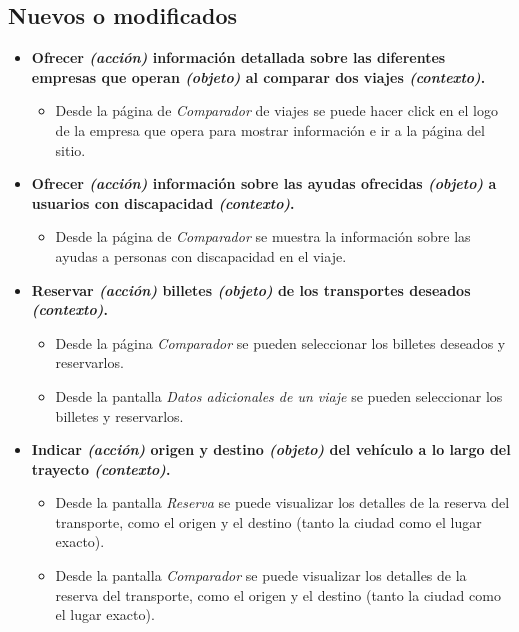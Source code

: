 \subsection*{Nuevos o modificados}

\begin{itemize}
    \item \textbf{Ofrecer \textit{(acción)} información detallada sobre las diferentes empresas que operan
        \textit{(objeto)} al comparar dos viajes \textit{(contexto)}.}
        \begin{itemize}
            \item Desde la página de \textit{Comparador} de viajes se puede hacer click en el logo de la empresa que
                opera para mostrar información e ir a la página del sitio.
        \end{itemize}
    
    \item \textbf{Ofrecer \textit{(acción)} información sobre las ayudas ofrecidas \textit{(objeto)} a usuarios 
        con discapacidad \textit{(contexto)}.}
        \begin{itemize}
            \item Desde la página de \textit{Comparador} se muestra la información sobre las ayudas a personas
                con discapacidad en el viaje.
        \end{itemize}
    
    \item \textbf{Reservar \textit{(acción)} billetes \textit{(objeto)} de los transportes deseados \textit{(contexto)}.} 
        \begin{itemize}
            \item Desde la página \textit{Comparador} se pueden seleccionar los billetes deseados y reservarlos.
            \item Desde la pantalla \textit{Datos adicionales de un viaje} se pueden seleccionar los billetes y reservarlos.
        \end{itemize}

    \item \textbf{Indicar \textit{(acción)} origen y destino \textit{(objeto)} del vehículo a lo largo del trayecto
        \textit{(contexto)}.}
        \begin{itemize}
            \item Desde la pantalla \textit{Reserva} se puede visualizar los detalles de la reserva del transporte, como el origen y el destino (tanto
                la ciudad como el lugar exacto).
            \item Desde la pantalla \textit{Comparador} se puede visualizar los detalles de la reserva del transporte, como el origen y el destino (tanto
            la ciudad como el lugar exacto).
        \end{itemize}





\end{itemize}
